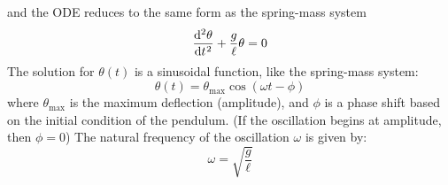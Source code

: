 
and the ODE reduces to the same form as the spring-mass system
\begin{equation}
  \diff[2]{\theta}t + \frac g\ell\theta=0
\end{equation}
The solution for $\theta(t)$ is a sinusoidal function, like the spring-mass
system:
\begin{equation}
  \boxed{\theta(t)=\theta_\text{max}\cos(\omega t-\phi)}
\end{equation}
where $\theta_\text{max}$ is the maximum deflection (amplitude), and $\phi$ is a
phase shift based on the initial condition of the pendulum. (If the oscillation
begins at amplitude, then $\phi=0$) The natural frequency of the oscillation
$\omega$ is given by:
\begin{equation}   
  \boxed{
    \omega=\sqrt{\frac g\ell}
  }
\end{equation}

